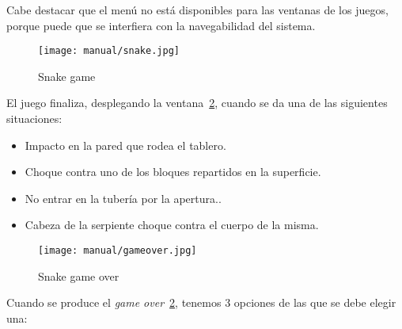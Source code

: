 Cabe destacar que el menú no está disponibles para las ventanas de los juegos, porque puede que se interfiera con la navegabilidad del sistema.

\begin{figure}[H]
	\centering
	\texttt{[image: manual/snake.jpg]}
	\caption{Snake game}\label{fig:snakepage}
\end{figure}

El juego finaliza, desplegando la ventana~\ref{fig:gameover}, cuando se da una de las siguientes situaciones:
\begin{itemize}
	\item Impacto en la pared que rodea el tablero.
	\item Choque contra uno de los bloques repartidos en la superficie.
	\item No entrar en la tubería por la apertura..
	\item Cabeza de la serpiente choque contra el cuerpo de la misma.
\end{itemize}

\begin{figure}[H]
	\centering
	\texttt{[image: manual/gameover.jpg]}
	\caption{Snake game over}\label{fig:gameover}
\end{figure}

Cuando se produce el \emph{game over}~\ref{fig:gameover}, tenemos 3 opciones de las que se debe elegir una:

